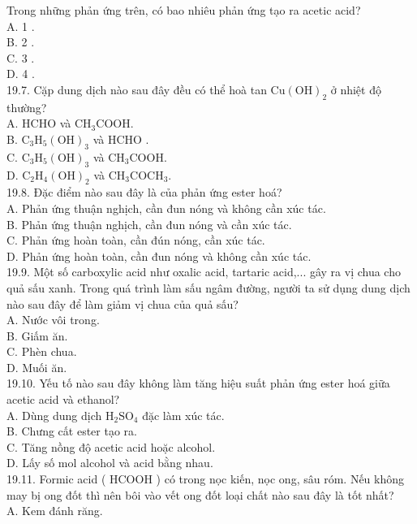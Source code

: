 \documentclass[10pt]{article}
\begin{document}
Trong những phản ứng trên, có bao nhiêu phản ứng tạo ra acetic acid?\\
A. 1 .\\
B. 2 .\\
C. 3 .\\
D. 4 .\\
19.7. Cặp dung dịch nào sau đây đều có thể hoà tan $\mathrm{Cu}(\mathrm{OH})_{2}$ ở nhiệt độ thường?\\
A. HCHO và $\mathrm{CH}_{3} \mathrm{COOH}$.\\
B. $\mathrm{C}_{3} \mathrm{H}_{5}(\mathrm{OH})_{3}$ và HCHO .\\
C. $\mathrm{C}_{3} \mathrm{H}_{5}(\mathrm{OH})_{3}$ và $\mathrm{CH}_{3} \mathrm{COOH}$.\\
D. $\mathrm{C}_{2} \mathrm{H}_{4}(\mathrm{OH})_{2}$ và $\mathrm{CH}_{3} \mathrm{COCH}_{3}$.\\
19.8. Đặc điểm nào sau đây là của phản ứng ester hoá?\\
A. Phản ứng thuận nghịch, cần đun nóng và không cần xúc tác.\\
B. Phản ứng thuận nghịch, cần đun nóng và cần xúc tác.\\
C. Phản ứng hoàn toàn, cần đún nóng, cần xúc tác.\\
D. Phản ứng hoàn toàn, cần đun nóng và không cần xúc tác.\\
19.9. Một số carboxylic acid như oxalic acid, tartaric acid,... gây ra vị chua cho quả sấu xanh. Trong quá trình làm sấu ngâm đường, người ta sử dụng dung dịch nào sau đây để làm giảm vị chua của quả sấu?\\
A. Nước vôi trong.\\
B. Giấm ăn.\\
C. Phèn chua.\\
D. Muối ăn.\\
19.10. Yếu tố nào sau đây không làm tăng hiệu suất phản ứng ester hoá giữa acetic acid và ethanol?\\
A. Dùng dung dịch $\mathrm{H}_{2} \mathrm{SO}_{4}$ đặc làm xúc tác.\\
B. Chưng cất ester tạo ra.\\
C. Tăng nồng độ acetic acid hoặc alcohol.\\
D. Lấy số mol alcohol và acid bằng nhau.\\
19.11. Formic acid ( HCOOH ) có trong nọc kiến, nọc ong, sâu róm. Nếu không may bị ong đốt thì nên bôi vào vết ong đốt loại chất nào sau đây là tốt nhất?\\
A. Kem đánh răng.\\
\end{document}
